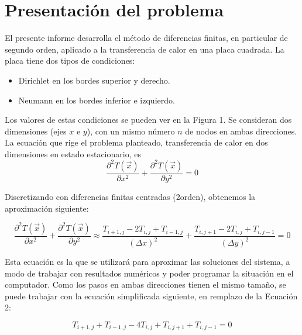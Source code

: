 \documentclass[12pt, notitlepage]{article}
\begin{document}
\section{Presentación del problema}
El presente informe desarrolla el método de diferencias finitas, en particular de segundo orden, aplicado a la transferencia de calor en una placa cuadrada. La placa tiene dos tipos de condiciones:
\begin{itemize}
\item{Dirichlet en los bordes superior y derecho.}
\item{Neumann en los bordes inferior e izquierdo.}
\end{itemize}

Los valores de estas condiciones se pueden ver en la Figura 1. Se consideran dos dimensiones (ejes $x$ e $y$), con un mismo número $n$ de nodos en ambas direcciones. La ecuación que rige el problema planteado, transferencia de calor en dos dimensiones en estado estacionario, es
\begin{equation}
\frac{\partial^2T(\vec{x})}{\partial x^2} + \frac{\partial^2T(\vec{x})}{\partial y^2} = 0
\end{equation}

Discretizando con diferencias finitas centradas (2\degree orden), obtenemos la aproximación siguiente:

\begin{equation}
\frac{\partial^2T(\vec{x})}{\partial x^2} + \frac{\partial^2T(\vec{x})}{\partial y^2} \approx \frac{T_{i+1,j} - 2T_{i,j} + T_{i-1,j}}{(\Delta x)^2} + \frac{T_{i,j+1} - 2T_{i,j} + T_{i,j-1}}{(\Delta y)^2} = 0
\end{equation}

Esta ecuación es la que se utilizará para aproximar las soluciones del sistema, a modo de trabajar con resultados numéricos y poder programar la situación en el computador. Como los pasos en ambas direcciones tienen el mismo tamaño, se puede trabajar con la ecuación simplificada siguiente, en remplazo de la Ecuación 2:

\begin{equation}
T_{i+1,j} + T_{i-1,j} - 4T_{i,j} + T_{i,j+1} + T_{i,j-1} = 0
\end{equation}

\end{document}
